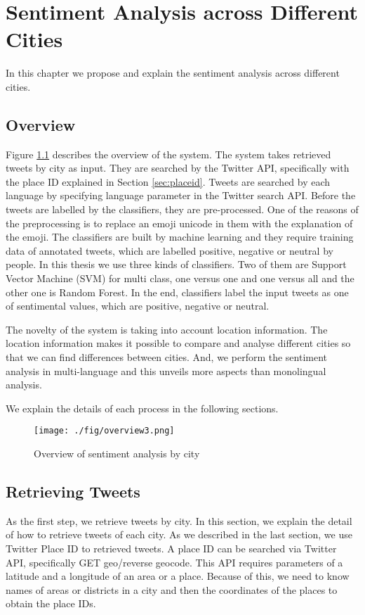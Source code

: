 \chapter{Sentiment Analysis across Different Cities}
In this chapter we propose and explain the sentiment analysis across different cities.
\section{Overview}\label{sec:overview}
Figure \ref{fig:overview} describes the overview of the system.
The system takes retrieved tweets by city as input.
They are searched by the Twitter API, specifically with the place ID explained in Section \ref{sec:placeid}.
Tweets are searched by each language by specifying language parameter in the Twitter search API.
Before the tweets are labelled by the classifiers, they are pre-processed.
One of the reasons of the preprocessing is to replace an emoji unicode in them with the explanation of the emoji.
The classifiers are built by machine learning and they require training data of annotated tweets, which are labelled positive, negative or neutral by people.
In this thesis we use three kinds of classifiers.
Two of them are Support Vector Machine (SVM) for multi class, one versus one and one versus all and the other one is Random Forest.
In the end, classifiers label the input tweets as one of sentimental values, which are positive, negative or neutral.

The novelty of the system is taking into account location information.
The location information makes it possible to compare and analyse different cities so that we can find differences between cities.
And, we perform the sentiment analysis in multi-language and this unveils more aspects than monolingual analysis.

We explain the details of each process in the following sections.
\begin{figure}
	\centering
	\texttt{[image: ./fig/overview3.png]}
	\caption{Overview of sentiment analysis by city}
	\label{fig:overview}
\end{figure}

\section{Retrieving Tweets}\label{sec:retrieving}
As the first step, we retrieve tweets by city.
In this section, we explain the detail of how to retrieve tweets of each city.
As we described in the last section, we use Twitter Place ID to retrieved tweets.
A place ID can be searched via Twitter API, specifically GET geo/reverse geocode.
This API requires parameters of a latitude and a longitude of an area or a place.
Because of this, we need to know names of areas or districts in a city and then the coordinates of the places to obtain the place IDs.

